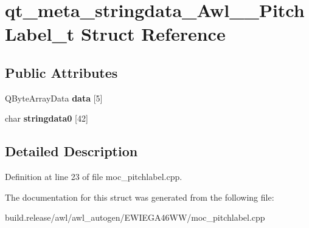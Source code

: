 \hypertarget{structqt__meta__stringdata___awl_____pitch_label__t}{}\section{qt\+\_\+meta\+\_\+stringdata\+\_\+\+Awl\+\_\+\+\_\+\+Pitch\+Label\+\_\+t Struct Reference}
\label{structqt__meta__stringdata___awl_____pitch_label__t}
\subsection*{Public Attributes}
\begin{DoxyCompactItemize}
\item 
\mbox{\label{structqt__meta__stringdata___awl_____pitch_label__t_a6558849fc8386c79d6aa0c2335992dfd}} 
Q\+Byte\+Array\+Data {\bfseries data} \mbox{[}5\mbox{]}
\item 
\mbox{\label{structqt__meta__stringdata___awl_____pitch_label__t_ad343086735c8176d278d36fb1b24e3e9}} 
char {\bfseries stringdata0} \mbox{[}42\mbox{]}
\end{DoxyCompactItemize}


\subsection{Detailed Description}


Definition at line 23 of file moc\+\_\+pitchlabel.\+cpp.



The documentation for this struct was generated from the following file\+:\begin{DoxyCompactItemize}
\item 
build.\+release/awl/awl\+\_\+autogen/\+E\+W\+I\+E\+G\+A46\+W\+W/moc\+\_\+pitchlabel.\+cpp\end{DoxyCompactItemize}

